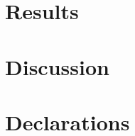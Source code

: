 \documentclass[11pt,a4paper]{article}
\begin{document}
\section{Results}


\section{Discussion}


\clearpage

%
\begingroup
\makeatletter
\renewcommand\paragraph{\@startsection{paragraph}{4}{\z@}%
  {1.5ex \@plus 0.4ex \@minus 0.2ex}%
  {-1em}%
  {\normalfont\normalsize\bfseries}}
\makeatother
\section*{Declarations}

\endgroup

\renewcommand{\bibfont}{\small}
\setlength{\bibsep}{1pt plus 0.5pt minus 0.5pt}


\end{document}
